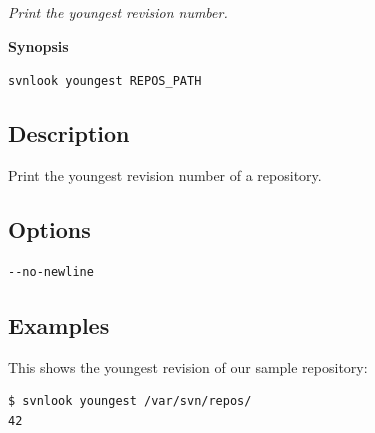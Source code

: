 \emph{Print the youngest revision number.}

\textbf{Synopsis}

\texttt{svnlook\ youngest\ REPOS\_PATH}

\subsection{Description}

Print the youngest revision number of a repository.

\subsection{Options}

\begin{verbatim}
--no-newline
\end{verbatim}

\subsection{Examples}

This shows the youngest revision of our sample repository:

\begin{verbatim}
$ svnlook youngest /var/svn/repos/ 
42
\end{verbatim}

